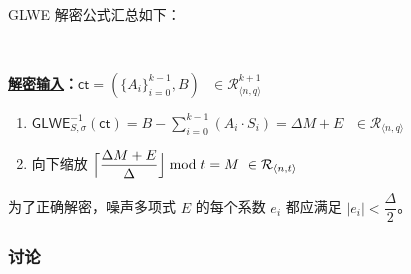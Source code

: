 $ $

GLWE 解密公式汇总如下：

$ $

\begin{tcolorbox}[title={\textbf{\tboxlabel{\ref*{subsec:glwe-dec}} GLWE 解密}}]
\textbf{\underline{解密输入}：}$\textsf{ct} = (\{A_i\}_{i=0}^{k-1}, B) \text{ } \in \mathcal{R}_{\langle n,q \rangle}^{k + 1}$

\begin{enumerate}
\item $\textsf{GLWE}^{-1}_{S,\sigma}(\textsf{ct}) = B - \sum\limits_{i=0}^{k-1}{(A_i \cdot S_i)} = \Delta  M + E \text{ } \in \mathcal{R}_{\langle n,q \rangle}$

\item 向下缩放
$\Bigl\lceil \dfrac{ \Delta  M + E }{\Delta}\Bigr\rfloor \bmod t = M \text{ } \in \mathcal{R}_{\langle n, t \rangle}$

\end{enumerate}

为了正确解密，噪声多项式 $E$ 的每个系数 $e_i$ 都应满足 $|e_i| < \dfrac{\Delta}{2}$。

\end{tcolorbox}


\subsubsection{讨论}

